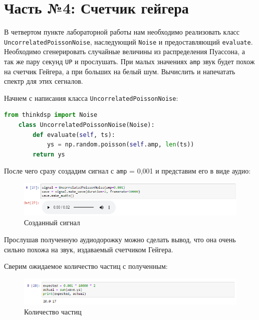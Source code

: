 \documentclass[a4paper]{article}
\begin{document}
        \section{Часть №4: Счетчик гейгера}
           В четвертом пункте лабораторной работы нам необходимо реализовать класс  \texttt{UncorrelatedPoissonNoise}, наследующий \texttt{Noise} и предоставляющий \texttt{evaluate}. Необходимо сгенерировать случайные величины из распределения Пуассона, а так же пару секунд \texttt{UP} и прослушать. При малых значениях \texttt{amp} звук будет похож на счетчик Гейгера, а при больших на белый шум. Вычислить и напечатать спектр для этих сегналов.
           
           Начнем с написания класса \texttt{UncorrelatedPoissonNoise}:
           
\begin{lstlisting}[language=Python, caption= Построение логарифмического спектра]
    from thinkdsp import Noise
    class UncorrelatedPoissonNoise(Noise):
        def evaluate(self, ts):
            ys = np.random.poisson(self.amp, len(ts))
        return ys
\end{lstlisting} 
           
           После чего сразу создадим сигнал с \texttt{amp} = 0,001 и представим его в виде аудио:
           
           \begin{figure}[H]
                \centering
                \includegraphics[width=\textwidth]{ex_4_signal_audio.png}
                \caption{Созданный сигнал}
                \label{fig:ex_4_signal_audio}
            \end{figure}
            
            Прослушав полученную аудиодорожку можно сделать вывод, что она очень сильно похожа на звук, издаваемый счетчиком Гейгера.
            
            Сверим ожидаемое количество частиц с полученным:
            
             \begin{figure}[H]
                \centering
                \includegraphics[width=\textwidth]{ex_4_signal_particles .png}
                \caption{Количество частиц}
                \label{fig:ex_4_signal_particles}
            \end{figure}
            
\end{document}
